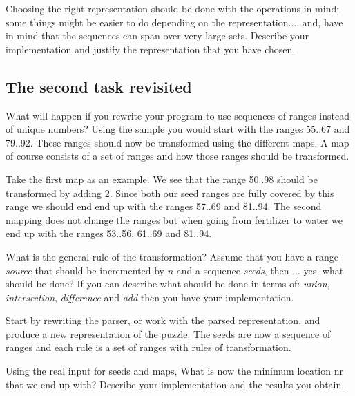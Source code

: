 \documentclass[a4paper,11pt]{article}
\begin{document}
Choosing the right representation should be done with the operations in
mind; some things might be easier to do depending on the
representation.... and, have in mind that the sequences can span over
very large sets. Describe your implementation and justify the
representation that you have chosen.

\subsection*{The second task revisited}

What will happen if you rewrite your program to use sequences of
ranges instead of unique numbers? Using the sample you would start
with the ranges 55..67 and 79..92. These ranges should now be
transformed using the different maps. A map of course consists of a set of
ranges and how those ranges should be transformed.

Take the first map as an example. We see that the range 50..98 should
be transformed by adding 2. Since both our seed ranges are fully
covered by this range we should end end up with the ranges 57..69 and
81..94. The second mapping does not change the ranges but when going from
fertilizer to water we end up with the ranges 53..56, 61..69 and 81..94.

What is the general rule of the transformation? Assume that you have a
range {\em source} that should be incremented by $n$ and a sequence
{\em seeds}, then ... yes, what should be done? If you can describe
what should be done in terms of: {\em union}, {\em intersection}, {\em
  difference} and {\em add} then you have your implementation.

Start by rewriting the parser, or work with the parsed representation,
and produce a new representation of the puzzle. The seeds are now a
sequence of ranges and each rule is a set of ranges with rules of
transformation.

Using the real input for seeds and maps, What is now the minimum
location nr that we end up with? Describe your implementation and the
results you obtain.
\end{document}
